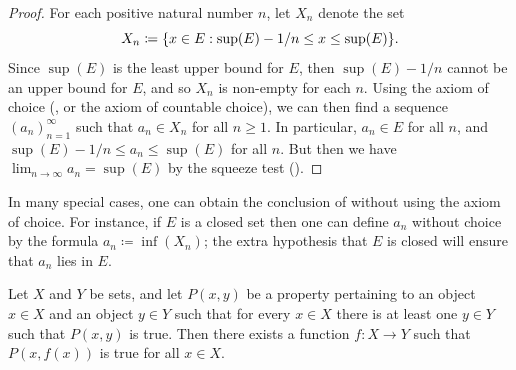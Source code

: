 \begin{proof}
  For each positive natural number \(n\), let \(X_n\) denote the set
  \[
    X_n \coloneqq \set{x \in E : \sup(E) - 1 / n \leq x \leq \sup(E)}.
  \]
  Since \(\sup(E)\) is the least upper bound for \(E\), then \(\sup(E) - 1 / n\) cannot be an upper bound for \(E\), and so \(X_n\) is non-empty for each \(n\).
  Using the axiom of choice (, or the axiom of countable choice), we can then find a sequence \((a_n)_{n = 1}^\infty\) such that \(a_n \in X_n\) for all \(n \geq 1\).
  In particular, \(a_n \in E\) for all \(n\), and \(\sup(E) - 1 / n \leq a_n \leq \sup(E)\) for all \(n\).
  But then we have \(\lim_{n \to \infty} a_n = \sup(E)\) by the squeeze test ().
\end{proof}

\begin{rmk}\label{i:8.4.6}
  In many special cases, one can obtain the conclusion of  without using the axiom of choice.
  For instance, if \(E\) is a closed set then one can define \(a_n\) without choice by the formula \(a_n \coloneqq \inf(X_n)\);
  the extra hypothesis that \(E\) is closed will ensure that \(a_n\) lies in \(E\).
\end{rmk}

\begin{prop}\label{i:8.4.7}
  Let \(X\) and \(Y\) be sets, and let \(P(x, y)\) be a property pertaining to an object \(x \in X\) and an object \(y \in Y\) such that for every \(x \in X\) there is at least one \(y \in Y\) such that \(P(x, y)\) is true.
  Then there exists a function \(f : X \to Y\) such that \(P(x, f(x))\) is true for all \(x \in X\).
\end{prop}

